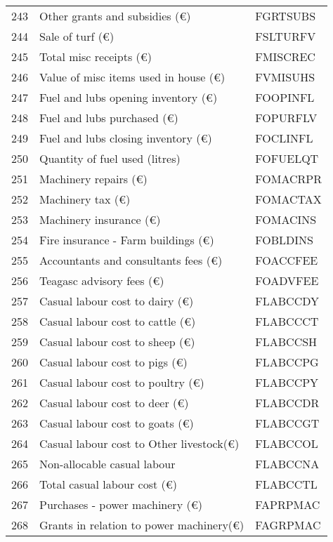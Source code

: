 \documentclass{article}\usepackage{graphicx, color}
\begin{document}
\begin{flushleft}
\begin{table}[ht]
\begin{center}
\begin{tabular}{rll}
  243 & Other grants and subsidies      (€) & FGRTSUBS \\ 
  244 & Sale of turf                    (€) & FSLTURFV \\ 
  245 & Total misc receipts             (€) & FMISCREC \\ 
  246 & Value of misc items used in house (€) & FVMISUHS \\ 
  247 & Fuel and lubs opening inventory   (€) & FOOPINFL \\ 
  248 & Fuel and lubs purchased           (€) & FOPURFLV \\ 
  249 & Fuel and lubs closing inventory   (€) & FOCLINFL \\ 
  250 & Quantity of fuel used        (litres) & FOFUELQT \\ 
  251 & Machinery repairs                 (€) & FOMACRPR \\ 
  252 & Machinery tax                     (€) & FOMACTAX \\ 
  253 & Machinery insurance               (€) & FOMACINS \\ 
  254 & Fire insurance - Farm buildings   (€) & FOBLDINS \\ 
  255 & Accountants and consultants fees  (€) & FOACCFEE \\ 
  256 & Teagasc advisory fees             (€) & FOADVFEE \\ 
  257 & Casual labour cost to dairy       (€) & FLABCCDY \\ 
  258 & Casual labour cost to cattle      (€) & FLABCCCT \\ 
  259 & Casual labour cost to sheep       (€) & FLABCCSH \\ 
  260 & Casual labour cost to pigs        (€) & FLABCCPG \\ 
  261 & Casual labour cost to poultry     (€) & FLABCCPY \\ 
  262 & Casual labour cost to deer        (€) & FLABCCDR \\ 
  263 & Casual labour cost to goats       (€) & FLABCCGT \\ 
  264 & Casual labour cost to Other livestock(€) & FLABCCOL \\ 
  265 & Non-allocable casual labour & FLABCCNA \\ 
  266 & Total casual labour cost          (€) & FLABCCTL \\ 
  267 & Purchases - power machinery        (€) & FAPRPMAC \\ 
  268 & Grants in relation to power machinery(€) & FAGRPMAC \\ 

\end{tabular}
\end{center}
\end{table}
\end{flushleft}
\end{document}
